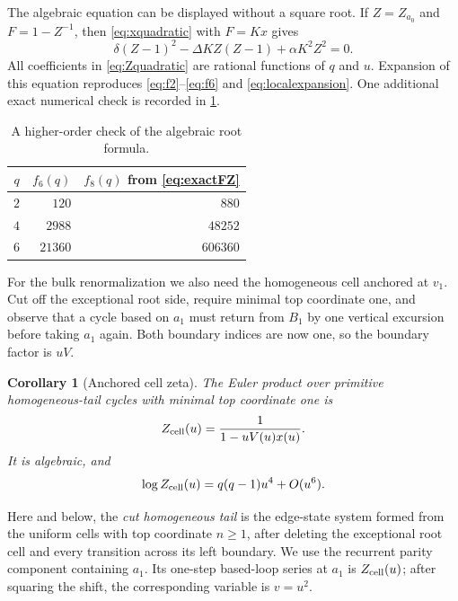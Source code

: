 \documentclass[11pt,reqno]{amsart}
\numberwithin{equation}{section}
\newtheorem{corollary}[theorem]{Corollary}
\theoremstyle{definition}
\theoremstyle{remark}
\begin{document}
The algebraic equation can be displayed without a square root.  If
$Z=Z_{a_0}$ and $F=1-Z^{-1}$, then \eqref{eq:xquadratic} with $F=Kx$ gives
\begin{equation}\label{eq:Zquadratic}
 \delta(Z-1)^2-\Delta KZ(Z-1)+\alpha K^2Z^2=0.
\end{equation}
All coefficients in \eqref{eq:Zquadratic} are rational functions of $q$ and
$u$.  Expansion of this equation reproduces \eqref{eq:f2}--\eqref{eq:f6} and
\eqref{eq:localexpansion}.  One additional exact numerical check is recorded
in \cref{tab:higher-coefficient-check}.
\begin{table}[ht]
\centering
\caption{A higher-order check of the algebraic root formula.}
\label{tab:higher-coefficient-check}
\begin{tabular}{c|rr}
\toprule
$q$ & $f_6(q)$ & $f_8(q)$ from \eqref{eq:exactFZ}\\
\midrule
$2$ & $120$ & $880$\\
$4$ & $2988$ & $48252$\\
$6$ & $21360$ & $606360$\\
\bottomrule
\end{tabular}
\end{table}

For the bulk renormalization we also need the homogeneous cell anchored at
$v_1$.  Cut off the exceptional root side, require minimal top coordinate one,
and observe that a cycle based on $a_1$ must return from $B_1$ by one vertical
excursion before taking $a_1$ again.  Both boundary indices are now one, so the
boundary factor is $uV$.

\begin{corollary}[Anchored cell zeta]\label{cor:cellzeta}
The Euler product over primitive homogeneous-tail cycles with minimal top
coordinate one is
\begin{equation}\label{eq:cellzeta}
 Z_{\rm cell}(u)=\frac1{1-uV(u)x(u)}.
\end{equation}
It is algebraic, and
\begin{equation}\label{eq:cellfirst}
 \log Z_{\rm cell}(u)=q(q-1)u^4+O(u^6).
\end{equation}
\end{corollary}

Here and below, the \emph{cut homogeneous tail} is the edge-state system
formed from the uniform cells with top coordinate $n\ge1$, after deleting the
exceptional root cell and every transition across its left boundary.  We use
the recurrent parity component containing $a_1$.  Its one-step based-loop
series at $a_1$ is $Z_{\rm cell}(u)$; after squaring the shift, the corresponding
variable is $v=u^2$.
\end{document}
